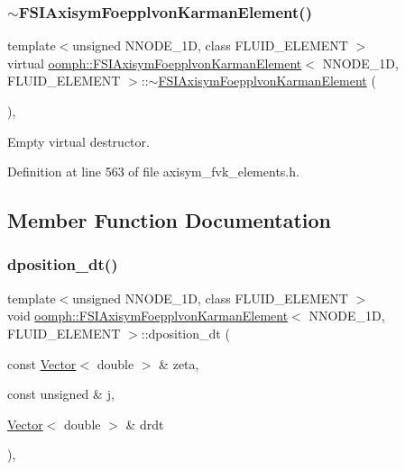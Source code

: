 \subsubsection{\texorpdfstring{$\sim$\+F\+S\+I\+Axisym\+Foepplvon\+Karman\+Element()}{~FSIAxisymFoepplvonKarmanElement()}}
{\footnotesize\ttfamily template$<$unsigned N\+N\+O\+D\+E\+\_\+1D, class F\+L\+U\+I\+D\+\_\+\+E\+L\+E\+M\+E\+NT $>$ \\
virtual \hyperlink{classoomph_1_1FSIAxisymFoepplvonKarmanElement}{oomph\+::\+F\+S\+I\+Axisym\+Foepplvon\+Karman\+Element}$<$ N\+N\+O\+D\+E\+\_\+1D, F\+L\+U\+I\+D\+\_\+\+E\+L\+E\+M\+E\+NT $>$\+::$\sim$\hyperlink{classoomph_1_1FSIAxisymFoepplvonKarmanElement}{F\+S\+I\+Axisym\+Foepplvon\+Karman\+Element} (\begin{DoxyParamCaption}{ }\end{DoxyParamCaption})\hspace{0.3cm}{\ttfamily [inline]}, {\ttfamily [virtual]}}



Empty virtual destructor. 



Definition at line 563 of file axisym\+\_\+fvk\+\_\+elements.\+h.



\subsection{Member Function Documentation}
\mbox{\label{classoomph_1_1FSIAxisymFoepplvonKarmanElement_a83bf7fe6d4d9dc08400aa853198c716d}} 
\subsubsection{\texorpdfstring{dposition\+\_\+dt()}{dposition\_dt()}}
{\footnotesize\ttfamily template$<$unsigned N\+N\+O\+D\+E\+\_\+1D, class F\+L\+U\+I\+D\+\_\+\+E\+L\+E\+M\+E\+NT $>$ \\
void \hyperlink{classoomph_1_1FSIAxisymFoepplvonKarmanElement}{oomph\+::\+F\+S\+I\+Axisym\+Foepplvon\+Karman\+Element}$<$ N\+N\+O\+D\+E\+\_\+1D, F\+L\+U\+I\+D\+\_\+\+E\+L\+E\+M\+E\+NT $>$\+::dposition\+\_\+dt (\begin{DoxyParamCaption}\item[{const \hyperlink{classoomph_1_1Vector}{Vector}$<$ double $>$ \&}]{zeta,  }\item[{const unsigned \&}]{j,  }\item[{\hyperlink{classoomph_1_1Vector}{Vector}$<$ double $>$ \&}]{drdt }\end{DoxyParamCaption})\hspace{0.3cm}{\ttfamily [inline]}, {\ttfamily [virtual]}}



